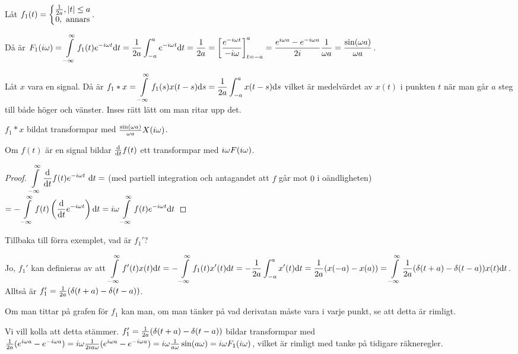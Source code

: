 \documentclass[a4paper]{article}
\begin{document}
\begin{ex}
    Låt \(
        f_1(t) = 
        \left\{\begin{matrix}
            \frac{1}{2a}, \abs{t} \leq a\\ 
            0, \text{ annars} 
        \end{matrix}\right.
    \).

    Då är \(
        F_1(i\omega) = \displaystyle\int\limits_{-\infty}^{\infty} f_1(t) e^{-i\omega t} \dd t 
        = \frac{1}{2a} \int_{-a}^a e^{-i\omega t} \dd t
        = \frac{1}{2a} = \left[\frac{e^{-i\omega t}}{-i\omega}\right]_{t=-a}^a
        = \frac{ e^{i\omega a} - e^{-i\omega a} }{2i} \frac{1}{\omega a} 
        = \frac{\sin(\omega a)}{\omega a}
    \).

    Låt \(
        x
    \) vara en signal. Då är \(
        f_1*x = \displaystyle\int\limits_{-\infty}^{\infty} f_1(s) x(t-s) \dd s = \frac{1}{2a} \int_{-a}^a x(t-s) \dd s
    \) vilket är medelvärdet av \(
        x(t)
    \) i punkten \(
        t
    \) när man går \(
        a 
    \) steg till både höger och vänster. Inses rätt lätt om man ritar upp det.

    \(
        f_1*x 
    \) bildat transformpar med \(
        \frac{\sin(\omega a)}{\omega a} X(i\omega)
    \).
\end{ex}

\begin{sats}
    Om \(
        f(t)
    \) är en signal bildar \(
        \dv{t} f(t)
    \) ett transformpar med \(
        i\omega F(i\omega)
    \). 

    \begin{proof}
        \(
            \infint \dv{t} f(t) e^{-\io t} \dd t
            = 
        \) (med partiell integration och antagandet att 
        \(
            f
        \) går mot \(
            0
        \)  i oändligheten) \(
            = - \displaystyle\int\limits_{-\infty}^{\infty} f(t) \left(\dv{t} e^{-i\omega t}\right)\dd t
            = i\omega \displaystyle\int\limits_{-\infty}^{\infty} f(t) e^{-i\omega t} \dd t
        \) 
    \end{proof}
\end{sats}

\begin{ex}
    Tillbaka till förra exemplet, vad är \(
        f_1'
    \)?

    Jo, \(
        f_1' 
    \) kan definieras av att \(
        \displaystyle\int\limits_{-\infty}^{\infty} f'(t)x(t) \dd t = -\displaystyle\int\limits_{-\infty}^{\infty} f_1(t) x'(t) \dd t
        = -\frac{1}{2a} \int_{-a}^a x'(t) \dd t 
        = \frac{1}{2a} (x(-a) - x(a)) 
        = \displaystyle\int\limits_{-\infty}^{\infty} \frac{1}{2a} (\delta(t+a) - \delta(t-a)) x(t) \dd t
    \). Alltså är \(
        f_1' = \frac{1}{2a} (\delta(t+a) - \delta(t-a))
    \). 

    Om man tittar på grafen för \(
        f_1
    \) kan man, om man tänker på vad derivatan måste vara i varje punkt,
    se att detta är rimligt.

    Vi vill kolla att detta stämmer. \(
        f_1' = \frac{1}{2a} (\delta(t+a) - \delta(t-a))
    \) bildar transformpar med \(
        \frac{1}{2a} (e^{i\omega a} - e^{-i\omega a})
        = i\omega \frac{1}{2ia\omega} (e^{i\omega a} - e^{-i\omega a})
        = i\omega \frac{1}{a\omega} \sin(a\omega)
        = i\omega F_1(i\omega)
    \), vilket är rimligt med tanke på tidigare räkneregler.
\end{ex}
\end{document}
